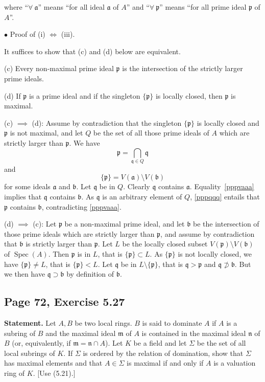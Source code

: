 \documentclass[parskip=half,fontsize=12pt]{scrartcl}%
\newcommand{\mf}{\mathfrak}
\newcommand{\aaa}{\mf a}
\newcommand{\bbb}{\mf b}
\newcommand{\mmm}{\mf m}
\newcommand{\nnn}{\mf n}
\newcommand{\ppp}{\mf p}
\newcommand{\qqq}{\mf q}
\newcommand{\bu}{\bullet}
\newcommand{\Spec}{\operatorname{Spec}}\newcommand{\Sp}{\operatorname{Spec}}
\begin{document}
where ``$\forall\ \aaa$'' means ``for all ideal $\aaa$ of $A$'' and ``$\forall\ \ppp$'' means ``for all prime ideal $\ppp$ of $A$''.\medskip 

$\bu$ Proof of (i) $\iff$ (iii). 

It suffices to show that (c) and (d) below are equivalent.

(c) Every non-maximal prime ideal $\ppp$ is the intersection of the strictly larger prime ideals.

(d) If $\ppp$ is a prime ideal and if the singleton $\{\ppp\}$ is locally closed, then $\ppp$ is maximal.

(c) $\implies$ (d): Assume by contradiction that the singleton $\{\ppp\}$ is locally closed and $\ppp$ is not maximal, and let $Q$ be the set of all those prime ideals of $A$ which are strictly larger than $\ppp$. We have 
\begin{equation}\label{pppqqq}
\ppp=\bigcap_{\qqq\in Q}\qqq
\end{equation} 
and  
\begin{equation}\label{pppvaaa}
\{\ppp\}=V(\aaa)\setminus V(\bbb)
\end{equation} 
for some ideals $\aaa$ and $\bbb$. Let $\qqq$ be in $Q$. Clearly $\qqq$ contains $\aaa$. Equality~\eqref{pppvaaa} implies that $\qqq$ contains $\bbb$. As $\qqq$ is an arbitrary element of $Q$, \eqref{pppqqq} entails that $\ppp$ contains $\bbb$, contradicting \eqref{pppvaaa}.

(d) $\implies$ (c): Let $\ppp$ be a non-maximal prime ideal, and let $\bbb$ be the intersection of those prime ideals which are strictly larger than $\ppp$, and assume by contradiction that $\bbb$ is strictly larger than $\ppp$. Let $L$ be the locally closed subset $V(\ppp)\setminus V(\bbb)$ of $\Spec(A)$. Then $\ppp$ is in $L$, that is $\{\ppp\}\subset L$. As $\{\ppp\}$ is not locally closed, we have $\{\ppp\}\ne L$, that is $\{\ppp\}<L$. Let $\qqq$ be in $L\setminus\{\ppp\}$, that is $\qqq>\ppp$ and $\qqq\not\supset\bbb$. But we then have $\qqq\supset\bbb$ by definition of $\bbb$. 

\subsection{Page 72, Exercise 5.27}%

\textbf{Statement.} Let $A,B$ be two local rings. $B$ is said to dominate $A$ if $A$ is a subring of $B$ and the maximal ideal $\mmm$ of $A$ is contained in the maximal ideal $\nnn$ of $B$ (or, equivalently, if $\mmm=\nnn\cap A$). Let $K$ be a field and let $\Sigma$ be the set of all local subrings of $K$. If $\Sigma$ is ordered by the relation of domination, show that $\Sigma$ has maximal elements and that $A\in\Sigma$ is maximal if and only if $A$ is a valuation ring of $K$. [Use (5.21).]
\end{document}
